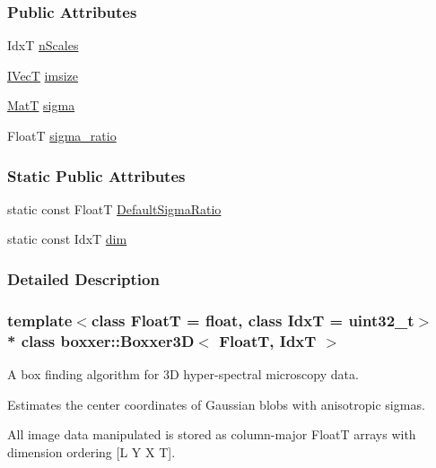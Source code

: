\subsubsection*{Public Attributes}
\begin{DoxyCompactItemize}
\item 
IdxT \hyperlink{classboxxer_1_1Boxxer3D_a344ef289cd330d4353c4605f2c2e2bbc}{n\+Scales}
\item 
\hyperlink{classboxxer_1_1Boxxer3D_a62a7f35aa283e2a833d13edaa228bca2}{I\+VecT} \hyperlink{classboxxer_1_1Boxxer3D_a236f3f4ada01376204e59f9f68d5fde6}{imsize}
\item 
\hyperlink{classboxxer_1_1Boxxer3D_ae155080a591506ca84d3d70f1cde337d}{MatT} \hyperlink{classboxxer_1_1Boxxer3D_a5df6b670e57ee7b6c2396650f6caba86}{sigma}
\item 
FloatT \hyperlink{classboxxer_1_1Boxxer3D_a63a9a0d9c56c11f34c7f2c80e0556335}{sigma\+\_\+ratio}
\end{DoxyCompactItemize}
\subsubsection*{Static Public Attributes}
\begin{DoxyCompactItemize}
\item 
static const FloatT \hyperlink{classboxxer_1_1Boxxer3D_a8a489401adebfc449a1e9390dcdfbbf4}{Default\+Sigma\+Ratio}
\item 
static const IdxT \hyperlink{classboxxer_1_1Boxxer3D_a8ae92f1badc81d59b178c12fb339e251}{dim}
\end{DoxyCompactItemize}


\subsubsection{Detailed Description}
\subsubsection*{template$<$class FloatT = float, class IdxT = uint32\+\_\+t$>$\\*
class boxxer\+::\+Boxxer3\+D$<$ Float\+T, Idx\+T $>$}

A box finding algorithm for 3D hyper-\/spectral microscopy data.

Estimates the center coordinates of Gaussian blobs with anisotropic sigmas.

All image data manipulated is stored as column-\/major FloatT arrays with dimension ordering \mbox{[}L Y X T\mbox{]}.

